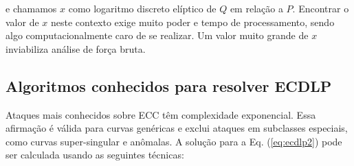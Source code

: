 e chamamos \(x\) como logaritmo discreto elíptico de \(Q\) em relação a \(P\). \cite{Hoffstein:2008} Encontrar o valor de \(x\) neste contexto exige muito poder e tempo de processamento, sendo algo computacionalmente caro de se realizar. Um valor muito grande de \(x\) inviabiliza análise de força bruta.

%
%
\subsection{Algoritmos conhecidos para resolver ECDLP}
\label{sec:algs}
Ataques mais conhecidos sobre ECC têm complexidade exponencial. Essa afirmação é válida para curvas genéricas e exclui ataques em subclasses especiais, como curvas super-singular e anômalas. A solução para a Eq. (\ref{eq:ecdlp2}) pode ser calculada usando as seguintes técnicas: \cite{Pelzl:2006}

